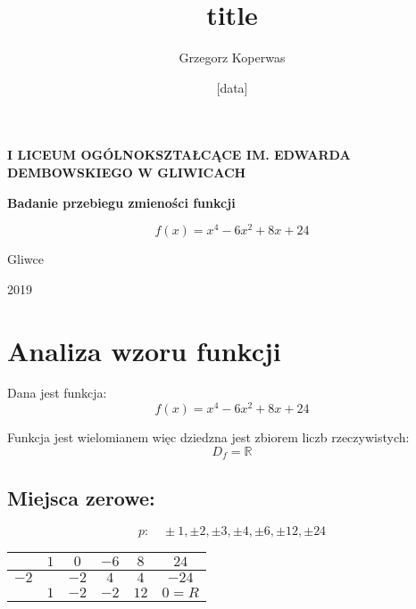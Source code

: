 \documentclass[a4paper,12pt]{article}
\title{title}
\author{Grzegorz Koperwas}
\date{[data]}
\begin{document}
\begin{titlepage}
	\begin{center}
		\Large{\textbf{I LICEUM OGÓLNOKSZTAŁCĄCE IM. EDWARDA DEMBOWSKIEGO W GLIWICACH}}

		\vspace{3cm}

		\theauthor

		\vspace{2.5cm}

		\textbf{Badanie przebiegu zmieności funkcji}

		\[f \left( x \right) = x^4 - 6x^2 + 8x + 24 \]

		\vfill

		Gliwce
		\vspace{0.5cm}

		\titlerule
		\vspace{0.6cm}

		2019

	\end{center}

\end{titlepage}

\section{Analiza wzoru funkcji}

Dana jest funkcja:
\[ f \left( x \right) = x^4  - 6x^2 + 8x + 24 \]

Funkcja jest wielomianem więc dziedzna jest zbiorem liczb rzeczywistych:
\[D_f = \mathbb{R} \]

\subsection{Miejsca zerowe:}
\[ p: \quad \pm 1, \pm 2, \pm 3, \pm 4, \pm 6, \pm 12, \pm 24\]

\begin{center}
	
\begin{tabular}{l|c|c|c|c|c}
                           & $1$ & $0$  & $-6$ & $8$  & $24$    \\ \hline

		$-2$ &     & $-2$ & $4$  & $4$  & $-24$   \\ \hline

                           & $1$ & $-2$ & $-2$ & $12$ & $0 = R$ \\  

\end{tabular}
\end{center}
\end{document}
